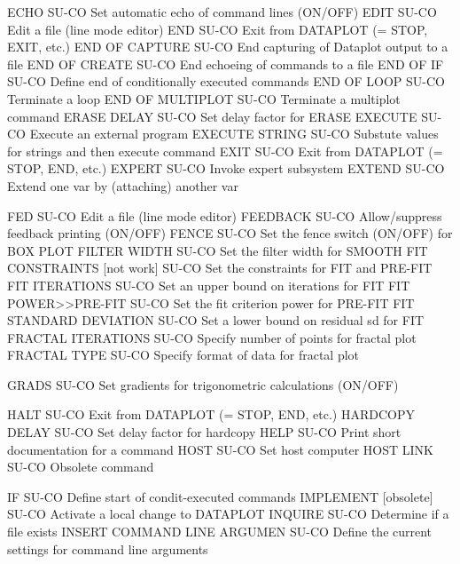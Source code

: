 ECHO                        SU-CO Set automatic echo of command lines (ON/OFF)
EDIT                        SU-CO Edit a file (line mode editor)
END                         SU-CO Exit from DATAPLOT (= STOP, EXIT, etc.)
END OF CAPTURE              SU-CO End capturing of Dataplot output to a file
END OF CREATE               SU-CO End echoeing of commands to a file
END OF IF                   SU-CO Define end of conditionally executed commands
END OF LOOP                 SU-CO Terminate a loop
END OF MULTIPLOT            SU-CO Terminate a multiplot command
ERASE DELAY                 SU-CO Set delay factor for ERASE
EXECUTE                     SU-CO Execute an external program
EXECUTE STRING              SU-CO Substute values for strings and then execute command
EXIT                        SU-CO Exit from DATAPLOT (= STOP, END, etc.)
EXPERT                      SU-CO Invoke expert subsystem
EXTEND                      SU-CO Extend one var by (attaching) another var

FED                         SU-CO Edit a file (line mode editor)
FEEDBACK                    SU-CO Allow/suppress feedback printing (ON/OFF)
FENCE                       SU-CO Set the fence switch (ON/OFF) for BOX PLOT
FILTER WIDTH                SU-CO Set the filter width for SMOOTH
FIT CONSTRAINTS [not work]  SU-CO Set the constraints for FIT and PRE-FIT
FIT ITERATIONS              SU-CO Set an upper bound on iterations for FIT
FIT POWER>>PRE-FIT          SU-CO Set the fit criterion power for PRE-FIT
FIT STANDARD DEVIATION      SU-CO Set a lower bound on residual sd for FIT
FRACTAL ITERATIONS          SU-CO Specify number of points for fractal plot
FRACTAL TYPE                SU-CO Specify format of data for fractal plot

GRADS                       SU-CO Set gradients for trigonometric calculations (ON/OFF)

HALT                        SU-CO Exit from DATAPLOT (= STOP, END, etc.)
HARDCOPY DELAY              SU-CO Set delay factor for hardcopy
HELP                        SU-CO Print short documentation for a command
HOST                        SU-CO Set host computer
HOST LINK                   SU-CO Obsolete command

IF                          SU-CO Define start of condit-executed commands
IMPLEMENT [obsolete]        SU-CO Activate a local change to DATAPLOT
INQUIRE                     SU-CO Determine if a file exists
INSERT COMMAND LINE ARGUMEN SU-CO Define the current settings for command line arguments

